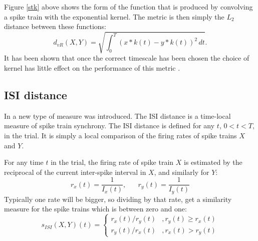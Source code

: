 
Figure \ref{stk} above shows the form of the function that is produced by
convolving a spike train with the exponential kernel.  The metric is then simply the $L_2$ distance between these functions:
\begin{equation}
d_{vR}(X,Y) =  \sqrt{\int_0^T (x*k(t) - y*k(t))^2\,dt}.
\end{equation}
It has been shown that once the correct timescale has been chosen the choice of kernel has 
little effect on the performance of this metric \citep{HoughtonVictor2009a}.

\subsection{ISI distance}
In \citep{KreuzEtAl2007a} a new type of measure was introduced.  The ISI distance is a time-local measure of spike train synchrony.  The ISI distance is defined for any $t$, $0<t<T$, in the trial.  It is simply a local comparison of the firing rates of spike trains $X$ and $Y$.  

For any time $t$ in the trial, the firing rate of spike train $X$ is estimated by the reciprocal of the current inter-spike interval in $X$, and similarly for $Y$:
\begin{equation}
r_x(t) = \frac{1}{I_x(t)}, \hspace{20pt} r_y(t) = \frac{1}{I_y(t)}
\end{equation}
Typically one rate will be bigger, so dividing by that rate, get a similarity measure for the spike trains which is between zero and one:
\begin{equation}
s_{ISI}(X,Y)(t) = \left\{ \begin{array}{ll} r_x(t)/r_y(t) & ,r_y(t) \geq r_x(t)\\ r_y(t)/r_x(t) & , r_x(t) > r_y(t) \end{array}\right.
\end{equation}

